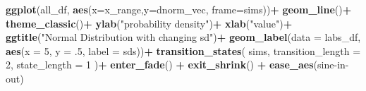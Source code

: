 \documentclass[
]{book}
\newenvironment{Shaded}{\begin{snugshade}}{\end{snugshade}}
\newcommand{\AttributeTok}[1]{\textcolor[rgb]{0.13,0.29,0.53}{#1}}
\newcommand{\DecValTok}[1]{\textcolor[rgb]{0.00,0.00,0.81}{#1}}
\newcommand{\FunctionTok}[1]{\textcolor[rgb]{0.13,0.29,0.53}{\textbf{#1}}}
\newcommand{\NormalTok}[1]{#1}
\newcommand{\SpecialCharTok}[1]{\textcolor[rgb]{0.81,0.36,0.00}{\textbf{#1}}}
\newcommand{\StringTok}[1]{\textcolor[rgb]{0.31,0.60,0.02}{#1}}
\begin{document}
\begin{Shaded}
\begin{Highlighting}[]
\FunctionTok{ggplot}\NormalTok{(all\_df, }\FunctionTok{aes}\NormalTok{(}\AttributeTok{x=}\NormalTok{x\_range,}\AttributeTok{y=}\NormalTok{dnorm\_vec, }\AttributeTok{frame=}\NormalTok{sims))}\SpecialCharTok{+}
  \FunctionTok{geom\_line}\NormalTok{()}\SpecialCharTok{+}
  \FunctionTok{theme\_classic}\NormalTok{()}\SpecialCharTok{+}
  \FunctionTok{ylab}\NormalTok{(}\StringTok{"probability density"}\NormalTok{)}\SpecialCharTok{+}
  \FunctionTok{xlab}\NormalTok{(}\StringTok{"value"}\NormalTok{)}\SpecialCharTok{+}
  \FunctionTok{ggtitle}\NormalTok{(}\StringTok{"Normal Distribution with changing sd"}\NormalTok{)}\SpecialCharTok{+}
  \FunctionTok{geom\_label}\NormalTok{(}\AttributeTok{data =}\NormalTok{ labs\_df, }\FunctionTok{aes}\NormalTok{(}\AttributeTok{x =} \DecValTok{5}\NormalTok{, }\AttributeTok{y =}\NormalTok{ .}\DecValTok{5}\NormalTok{, }\AttributeTok{label =}\NormalTok{ sds))}\SpecialCharTok{+}
   \FunctionTok{transition\_states}\NormalTok{(}
\NormalTok{    sims,}
    \AttributeTok{transition\_length =} \DecValTok{2}\NormalTok{,}
    \AttributeTok{state\_length =} \DecValTok{1}
\NormalTok{  )}\SpecialCharTok{+}
  \FunctionTok{enter\_fade}\NormalTok{() }\SpecialCharTok{+} 
  \FunctionTok{exit\_shrink}\NormalTok{() }\SpecialCharTok{+}
  \FunctionTok{ease\_aes}\NormalTok{(}\StringTok{\textquotesingle{}sine{-}in{-}out\textquotesingle{}}\NormalTok{)}
\end{Highlighting}
\end{Shaded}



\end{document}
